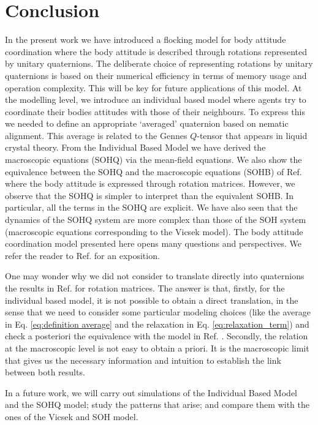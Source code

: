 \documentclass[12pt]{article}
\begin{document}
\section{Conclusion}



In the present work we have introduced a flocking model for body attitude coordination where the body attitude is described through rotations represented by unitary quaternions. The deliberate choice of representing rotations by unitary quaternions is based on their numerical efficiency in terms of memory usage and operation complexity. This will be key for future applications of this model. 
At the modelling level, we introduce an individual based model where agents try to coordinate their bodies attitudes with those of their neighbours. To express this we needed to define an appropriate `averaged' quaternion based on nematic alignment. This average is related to the Gennes $Q$-tensor that appears in liquid crystal theory. From the Individual Based Model we have derived the macroscopic equations (SOHQ) via the mean-field equations. We also show the equivalence between the SOHQ and the macroscopic equations (SOHB) of Ref. \cite{bodyattitude} where the body attitude is expressed through rotation matrices. However, we observe that the SOHQ is simpler to interpret than the equivalent SOHB. In particular, all the terms in the SOHQ are explicit. 
We have also seen that the dynamics of the SOHQ system are more complex than those of the SOH system (macroscopic equations corresponding to the Vicsek model). The body attitude coordination model presented here opens many questions and perspectives. We refer the reader to Ref. \cite[Conclusions and open questions]{bodyattitude} for an exposition.

One may wonder why we did not consider to translate directly into quaternions the results in Ref. \cite{bodyattitude} for rotation matrices. The answer is that, firstly, for the individual based model, it is not possible to obtain a direct translation, in the sense that we need to consider some particular modeling choices (like the average in Eq. \eqref{eq:definition average} and the relaxation in Eq. \eqref{eq:relaxation_term}) and check a posteriori the equivalence with the model in Ref. \cite{bodyattitude}. Secondly, the relation at the macroscopic level is not easy to obtain a priori. It is the macroscopic limit that gives us the necessary information and intuition to establish the link between both results.

In a future work, we will carry out simulations of the Individual Based Model and the SOHQ model; study the patterns that arise; and compare them with the ones of the Vicsek and SOH model. 
\end{document}
